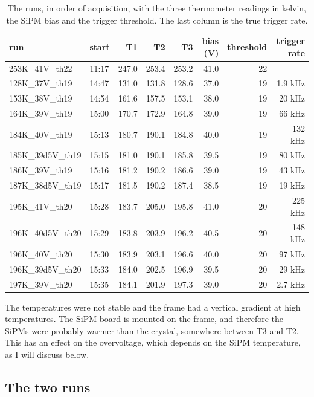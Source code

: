 \documentclass[11pt]{article}
\begin{document}
\begin{table}[tbhp!]
\centering
\label{tab:runs}
\begin{tabular}{l l r r r r r r}
\toprule
run & start & T1 & T2 & T3 & bias (V) & threshold & trigger rate \\
\midrule
253K\_41V\_th22   & 11:17 & 247.0 & 253.4 & 253.2 & 41.0 & 22 & \\
128K\_37V\_th19   & 14:47 & 131.0 & 131.8 & 128.6 & 37.0 & 19 & 1.9 kHz \\
153K\_38V\_th19   & 14:54 & 161.6 & 157.5 & 153.1 & 38.0 & 19 & 20 kHz \\
164K\_39V\_th19   & 15:00 & 170.7 & 172.9 & 164.8 & 39.0 & 19 & 66 kHz \\
184K\_40V\_th19   & 15:13 & 180.7 & 190.1 & 184.8 & 40.0 & 19 & 132 kHz \\
185K\_39d5V\_th19 & 15:15 & 181.0 & 190.1 & 185.8 & 39.5 & 19 & 80 kHz \\
186K\_39V\_th19   & 15:16 & 181.2 & 190.2 & 186.6 & 39.0 & 19 & 43 kHz \\
187K\_38d5V\_th19 & 15:17 & 181.5 & 190.2 & 187.4 & 38.5 & 19 & 19 kHz \\
195K\_41V\_th20   & 15:28 & 183.7 & 205.0 & 195.8 & 41.0 & 20 & 225 kHz \\
196K\_40d5V\_th20 & 15:29 & 183.8 & 203.9 & 196.2 & 40.5 & 20 & 148 kHz \\
196K\_40V\_th20   & 15:30 & 183.9 & 203.1 & 196.6 & 40.0 & 20 & 97 kHz \\
196K\_39d5V\_th20 & 15:33 & 184.0 & 202.5 & 196.9 & 39.5 & 20 & 29 kHz \\
197K\_39V\_th20   & 15:35 & 184.1 & 201.9 & 197.3 & 39.0 & 20 & 2.7 kHz \\
\bottomrule
\end{tabular}
\caption{The runs, in order of acquisition, with the three thermometer
readings in kelvin, the SiPM bias and the
trigger threshold. The last column is the true trigger rate.}
\end{table}

The temperatures were not stable and 
the frame had a vertical gradient at high temperatures. The SiPM board is mounted on the frame, and therefore
 the SiPMs were probably warmer than the crystal, somewhere between T3 and T2. This has an effect on the
 overvoltage, which depends on the SiPM temperature, as I will discuss below. 
\subsection{The two runs}
\label{sec:sipm}
\end{document}
